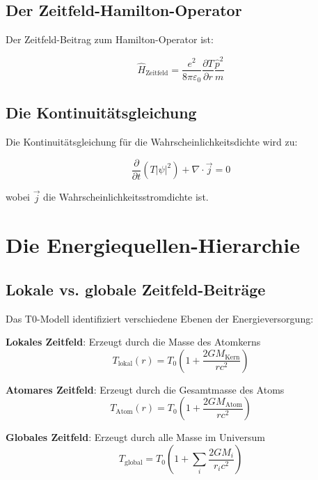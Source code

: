 \documentclass[12pt,a4paper]{report}
\begin{document}
	\subsection{Der Zeitfeld-Hamilton-Operator}
	
	Der Zeitfeld-Beitrag zum Hamilton-Operator ist:
	
	\begin{equation}
		\hat{H}_{\text{Zeitfeld}} = \frac{e^2}{8\pi\varepsilon_0} \frac{\partial T}{\partial r} \frac{\hat{p}^2}{m}
	\end{equation}
	
	\subsection{Die Kontinuitätsgleichung}
	
	Die Kontinuitätsgleichung für die Wahrscheinlichkeitsdichte wird zu:
	
	\begin{equation}
		\frac{\partial}{\partial t}(T|\psi|^2) + \nabla \cdot \vec{j} = 0
	\end{equation}
	
	wobei $\vec{j}$ die Wahrscheinlichkeitsstromdichte ist.
	
	\section{Die Energiequellen-Hierarchie}
	
	\subsection{Lokale vs. globale Zeitfeld-Beiträge}
	
	Das T0-Modell identifiziert verschiedene Ebenen der Energieversorgung:
	
	\textbf{Lokales Zeitfeld}: Erzeugt durch die Masse des Atomkerns
	\begin{equation}
		T_{\text{lokal}}(r) = T_0\left(1 + \frac{2GM_{\text{Kern}}}{rc^2}\right)
	\end{equation}
	
	\textbf{Atomares Zeitfeld}: Erzeugt durch die Gesamtmasse des Atoms
	\begin{equation}
		T_{\text{Atom}}(r) = T_0\left(1 + \frac{2GM_{\text{Atom}}}{rc^2}\right)
	\end{equation}
	
	\textbf{Globales Zeitfeld}: Erzeugt durch alle Masse im Universum
	\begin{equation}
		T_{\text{global}} = T_0\left(1 + \sum_i \frac{2GM_i}{r_i c^2}\right)
	\end{equation}
	
\end{document}
